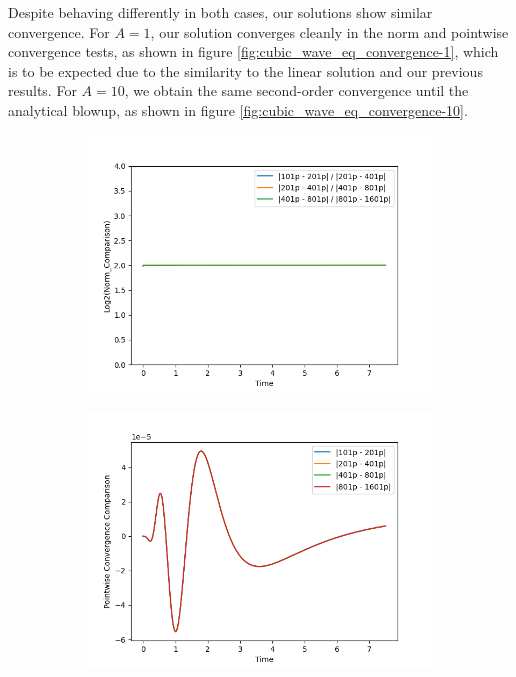 Despite behaving differently in both cases, our solutions show similar convergence. For $A=1$, our solution converges cleanly in the norm and pointwise convergence tests, as shown in figure \ref{fig:cubic_wave_eq_convergence-1}, which is to be expected due to the similarity to the linear solution and our previous results. For $A = 10$, we obtain the same second-order convergence until the analytical blowup, as shown in figure \ref{fig:cubic_wave_eq_convergence-10}. 

\begin{figure}[h]
    \centering
    \begin{subfigure}[b]{0.45\textwidth}
        \centering
        \includegraphics[width=\textwidth]{Images/Cubic_Wave_Equation_3+1_Spherical-A=1-Norm.png}
    \end{subfigure}
    \hfill
    \begin{subfigure}[b]{0.45\textwidth}
        \centering
        \includegraphics[width=\textwidth]{Images/Cubic_Wave_Equation_3+1_Spherical-A=1-Pointwise.png}

\end{subfigure}
\end{figure}
